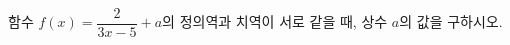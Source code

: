 \hspace*{2mm}\begin{minipage}[t]{\dimexpr\linewidth-2mm\relax}\vspace{0pt}
함수 $f(x)=\dfrac{2}{3x-5}+a$의 정의역과 치역이 서로 같을 때, 상수 $a$의 값을 구하시오.\end{minipage}

